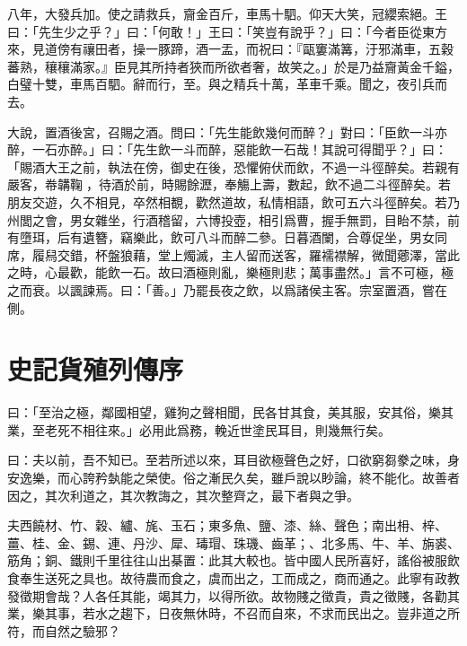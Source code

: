 八年，大發兵加。使之請救兵，齎金百斤，車馬十駟。仰天大笑，冠纓索絕。王曰：「先生少之乎？」曰：「何敢！」王曰：「笑豈有說乎？」曰：「今者臣從東方來，見道傍有禳田者，操一豚蹄，酒一盂，而祝曰：『甌窶滿篝，汙邪滿車，五穀蕃熟，穰穰滿家。』臣見其所持者狹而所欲者奢，故笑之。」於是乃益齎黃金千鎰，白璧十雙，車馬百駟。辭而行，至。與之精兵十萬，革車千乘。聞之，夜引兵而去。

大說，置酒後宮，召賜之酒。問曰：「先生能飲幾何而醉？」對曰：「臣飲一斗亦醉，一石亦醉。」曰：「先生飲一斗而醉，惡能飲一石哉！其說可得聞乎？」曰：「賜酒大王之前，執法在傍，御史在後，恐懼俯伏而飲，不過一斗徑醉矣。若親有嚴客，帣韝鞠{\selectfont 𦜕}，待酒於前，時賜餘瀝，奉觴上壽，數起，飲不過二斗徑醉矣。若朋友交遊，久不相見，卒然相覩，歡然道故，私情相語，飲可五六斗徑醉矣。若乃州閭之會，男女雜坐，行酒稽留，六博投壺，相引爲曹，握手無罰，目眙不禁，前有墮珥，后有遺簪，竊樂此，飲可八斗而醉二參。日暮酒闌，合尊促坐，男女同席，履舄交錯，杯盤狼藉，堂上燭滅，主人留而送客，羅襦襟解，微聞薌澤，當此之時，心最歡，能飲一石。故曰酒極則亂，樂極則悲；萬事盡然。」言不可極，極之而衰。以諷諫焉。曰：「善。」乃罷長夜之飲，以爲諸侯主客。宗室置酒，嘗在側。

\theendnotes

\section[貨殖列傳序\quad{\small 史記}]{{\normalsize 史記}\quad 貨殖列傳序}
曰：「至治之極，鄰國相望，雞狗之聲相聞，民各甘其食，美其服，安其俗，樂其業，至老死不相往來。」必用此爲務，輓近世塗民耳目，則幾無行矣。

曰：夫以前，吾不知已。至若所述以來，耳目欲極聲色之好，口欲窮芻豢之味，身安逸樂，而心誇矜埶能之榮使。俗之漸民久矣，雖戶說以眇論，終不能化。故善者因之，其次利道之，其次教誨之，其次整齊之，最下者與之爭。

夫西饒材、竹、穀、纑、旄、玉石；東多魚、鹽、漆、絲、聲色；南出枏、梓、薑、桂、金、錫、連、丹沙、犀、瑇瑁、珠璣、齒革；、北多馬、牛、羊、旃裘、筋角；銅、鐵則千里往往山出棊置：此其大較也。皆中國人民所喜好，謠俗被服飲食奉生送死之具也。故待農而食之，虞而出之，工而成之，商而通之。此寧有政教發徵期會哉？人各任其能，竭其力，以得所欲。故物賤之徵貴，貴之徵賤，各勸其業，樂其事，若水之趨下，日夜無休時，不召而自來，不求而民出之。豈非道之所符，而自然之驗邪？


